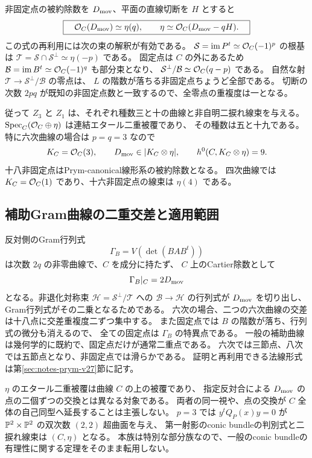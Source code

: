 非固定点の被約除数を $D_{\rm mov}$、平面の直線切断を $H$ とすると
\[
 \boxed{\quad\mathcal O_C(D_{\rm mov})\simeq\eta(q),\qquad
 \eta\simeq\mathcal O_C(D_{\rm mov}-qH).\quad}
\]
この式の再利用には次の束の解釈が有効である。
$\mathcal S=\operatorname{im}P^t\simeq\mathcal O_C(-1)^p$ の根基は
$\mathcal T=\mathcal S\cap\mathcal S^\perp\simeq\eta(-p)$ である。
固定点は $C$ の外にあるため
$\mathcal B=\operatorname{im}B^t\simeq\mathcal O_C(-1)^q$ も部分束となり、
$\mathcal S^\perp/\mathcal B\simeq\mathcal O_C(q-p)$ である。
自然な射 $\mathcal T\to\mathcal S^\perp/\mathcal B$ の零点は、
$L$ の階数が落ちる非固定点ちょうど全部である。
切断の次数 $2pq$ が既知の非固定点数と一致するので、全零点の重複度は一となる\cite{PaperII}。

従って $Z_3$ と $Z_1$ は、それぞれ種数三と十の曲線と非自明二捩れ線束を与える。
$\operatorname{Spec}_C(\mathcal O_C\oplus\eta)$ は連結エタール二重被覆であり、
その種数は五と十九である。特に六次曲線の場合は $p=q=3$ なので
\[
 K_C=\mathcal O_C(3),\qquad
 D_{\rm mov}\in|K_C\otimes\eta|,\qquad
 h^0(C,K_C\otimes\eta)=9.
\]
十八非固定点はPrym-canonical線形系の被約除数となる。
四次曲線では $K_C=\mathcal O_C(1)$ であり、十六非固定点の線束は $\eta(4)$ である。

\subsection{補助Gram曲線の二重交差と適用範囲}
反対側のGram行列式
\[
 \Gamma_B=V(\det(BAB^t))
\]
は次数 $2q$ の非零曲線で、$C$ を成分に持たず、
$C$ 上のCartier除数として
\[
 \Gamma_B|_C=2D_{\rm mov}
\]
となる。非退化対称束 $\mathcal H=\mathcal S^\perp/\mathcal T$ への
$\mathcal B\to\mathcal H$ の行列式が $D_{\rm mov}$ を切り出し、
Gram行列式がその二乗となるためである。
六次の場合、二つの六次曲線の交差は十八点に交差重複度二ずつ集中する。
また固定点では $B$ の階数が落ち、行列式の微分も消えるので、
全ての固定点は $\Gamma_B$ の特異点である。
一般の補助曲線は幾何学的に既約で、固定点だけが通常二重点である。
六次では三節点、八次では五節点となり、非固定点では滑らかである。
証明と再利用できる法線形式は第\ref{sec:notes-prym-v27}節に記す。

$\eta$ のエタール二重被覆は曲線 $C$ の上の被覆であり、
指定反対合による $D_{\rm mov}$ の点の二個ずつの交換とは異なる対象である。
両者の同一視や、点の交換が $C$ 全体の自己同型へ延長することは主張しない。
$p=3$ では $y^tQ_P(x)y=0$ が $\mathbb P^2\times\mathbb P^2$ の双次数 $(2,2)$ 超曲面を与え、
第一射影のconic bundleの判別式と二捩れ線束は $(C,\eta)$ となる。
本族は特別な部分族なので、一般のconic bundleの有理性に関する定理をそのまま転用しない。

